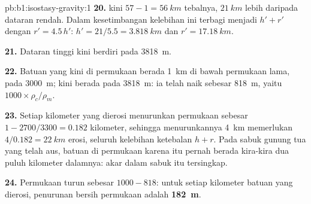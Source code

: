 \begin{solution}{pb:b1:isostasy-gravity:1}
\textbf{20.}  kini $57 - 1 = \qty{56}{km}$ tebalnya, $\qty{21}{km}$ lebih
daripada dataran rendah. Dalam kesetimbangan kelebihan ini terbagi menjadi $h' + r'$ dengan
$r' = 4.5\,h'$: $h' = 21/5.5 = \qty{3.818}{km}$ dan $r' = \qty{17.18}{km}$.

\textbf{21.} Dataran tinggi kini berdiri pada \qty{3818}{m}.

\textbf{22.} Batuan yang kini di permukaan berada \qty{1}{km} di bawah permukaan lama,
pada \qty{3000}{m}; kini berada pada \qty{3818}{m}: ia telah naik sebesar \qty{818}{m},
yaitu $1000\times\rho_c/\rho_m$.

\textbf{23.} Setiap kilometer yang dierosi menurunkan permukaan sebesar $1 - 2700/3300 =
0.182$ kilometer, sehingga menurunkannya \qty{4}{km} memerlukan
$4/0.182 = \qty{22}{km}$ erosi, seluruh kelebihan ketebalan $h + r$. Pada
sabuk gunung tua yang telah aus, batuan di permukaan karena itu pernah berada kira-kira
dua puluh kilometer dalamnya: akar dalam sabuk itu tersingkap.

\textbf{24.} Permukaan turun sebesar $1000 - 818$: untuk setiap kilometer batuan
yang dierosi, penurunan bersih permukaan adalah
\textbf{\qty[text-series-to-math=true]{182}{m}}.
\end{solution}
